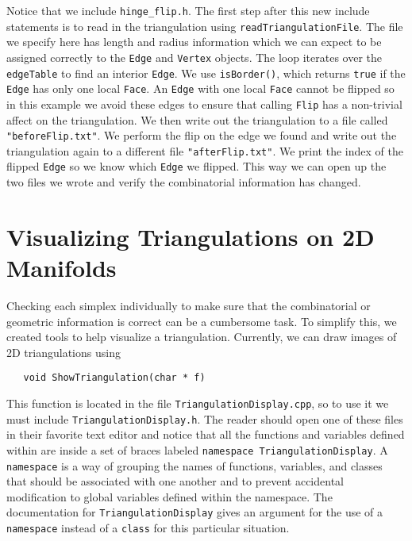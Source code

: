 \documentclass{amsart}
\theoremstyle{plain}
\numberwithin{equation}{section}
\begin{document}
\bigskip

Notice that we include \verb|hinge_flip.h|. The first step after this new include statements is to read in the triangulation using \verb|readTriangulationFile|. The file we specify here has length and radius information which we can expect to be assigned correctly to the \verb|Edge| and \verb|Vertex| objects. The loop iterates over the \verb|edgeTable| to find an interior \verb|Edge|. We use \verb|isBorder()|, which returns \verb|true| if the \verb|Edge| has only one local \verb|Face|. An \verb|Edge| with one local \verb|Face| cannot be flipped so in this example we avoid these edges to ensure that calling \verb|Flip| has a non-trivial affect on the triangulation. We then write out the triangulation to a file called \verb|"beforeFlip.txt"|. We perform the flip on the edge we found and write out the triangulation again to a different file \verb|"afterFlip.txt"|. We print the index of the flipped \verb|Edge| so we know which \verb|Edge| we flipped. This way we can open up the two files we wrote and verify the combinatorial information has changed.

\section*{Visualizing Triangulations on 2D Manifolds}

Checking each simplex individually to make sure that the combinatorial or geometric information is correct can be a cumbersome task. To simplify this, we created tools to help visualize a triangulation. Currently, we can draw images of 2D triangulations using\\

\begin{verbatim}
   void ShowTriangulation(char * f) 
\end{verbatim}

\bigskip

This function is located in the file \verb|TriangulationDisplay.cpp|, so to use it we must include \verb|TriangulationDisplay.h|. The reader should open one of these files in their favorite text editor and notice that all the functions and variables defined within are inside a set of braces labeled \verb|namespace TriangulationDisplay|. A \verb|namespace| is a way of grouping the names of functions, variables, and classes that should be associated with one another and to prevent accidental modification to global variables defined within the namespace. The documentation for \verb|TriangulationDisplay| gives an argument for the use of a \verb|namespace| instead of a \verb|class| for this particular situation.
\end{document}
